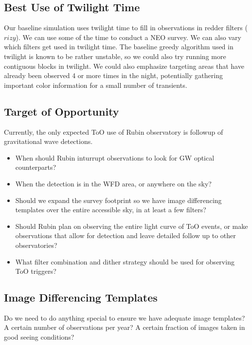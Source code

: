 \subsection{Best Use of Twilight Time}

Our baseline simulation uses twilight time to fill in observations in redder filters ($rizy$). We can use some of the time to conduct a NEO survey. We can also vary which filters get used in twilight time. The baseline greedy algorithm used in twilight is known to be rather unstable, so we could also try running more contiguous blocks in twilight. We could also emphasize targeting areas that have already been observed 4 or more times in the night, potentially gathering important color information for a small number of transients.


\subsection{Target of Opportunity}

Currently, the only expected ToO use of Rubin observatory is followup of gravitational wave detections.

\begin{itemize}
    \item{When should Rubin inturrupt observations to look for GW optical counterparts?}
    \item{When the detection is in the WFD area, or anywhere on the sky?}
    \item{Should we expand the survey footprint so we have image differencing templates over the entire accessible sky, in at least a few filters?}
    \item{Should Rubin plan on observing the entire light curve of ToO events, or make observations that allow for detection and leave detailed follow up to other observatories?}
    \item{What filter combination and dither strategy should be used for observing ToO triggers?} 
\end{itemize}


\subsection{Image Differencing Templates}

Do we need to do anything special to ensure we have adequate image templates? A certain number of observations per year? A certain fraction of images taken in good seeing conditions?

